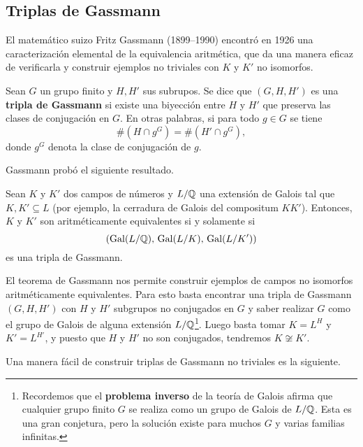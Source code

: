 \subsection{Triplas de Gassmann}

El matemático suizo Fritz Gassmann (1899--1990) encontró en 1926 una
caracterización elemental de la equivalencia aritmética, que da una manera
eficaz de verificarla y construir ejemplos no triviales con $K$ y $K'$ no
isomorfos.

\begin{definicion}
  Sean $G$ un grupo finito y $H, H'$ sus subrupos. Se dice que $(G,H,H')$ es una
  \textbf{tripla de Gassmann} si existe una biyección entre $H$ y $H'$ que
  preserva las clases de conjugación en $G$. En otras palabras, si para todo
  $g \in G$ se tiene
  $$\# (H\cap g^G) = \# (H'\cap g^G),$$
  donde $g^G$ denota la clase de conjugación de $g$.
\end{definicion}

Gassmann probó el siguiente resultado.

\begin{teorema}
  Sean $K$ y $K'$ dos campos de números y $L/\mathbb{Q}$ una extensión de Galois tal
  que $K, K' \subseteq L$ (por ejemplo, la cerradura de Galois del compositum
  $K K'$). Entonces, $K$ y $K'$ son aritméticamente equivalentes si y solamente
  si
  $$(\operatorname{Gal} (L/\mathbb{Q}), \, \operatorname{Gal} (L/K), \, \operatorname{Gal} (L/K'))$$
  es una tripla de Gassmann.
\end{teorema}

El teorema de Gassmann nos permite construir ejemplos de campos no isomorfos
aritméticamente equivalentes. Para esto basta encontrar una tripla de Gassmann
$(G, H, H')$ con $H$ y $H'$ subgrupos no conjugados en $G$ y saber realizar $G$
como el grupo de Galois de alguna extensión $L/\mathbb{Q}$\footnote{Recordemos que el
  \textbf{problema inverso} de la teoría de Galois afirma que cualquier grupo
  finito $G$ se realiza como un grupo de Galois de $L/\mathbb{Q}$. Esta es una gran
  conjetura, pero la solución existe para muchos $G$ y varias familias
  infinitas.}. Luego basta tomar $K = L^H$ y $K' = L^{H'}$, y puesto que $H$ y
$H'$ no son conjugados, tendremos $K \not\cong K'$.

Una manera fácil de construir triplas de Gassmann no triviales es la siguiente.

